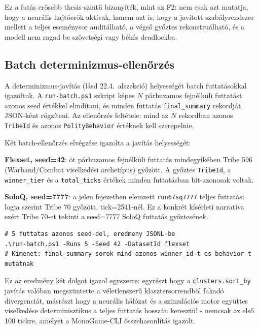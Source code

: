 ﻿\documentclass[a4paper,12pt]{report}
\begin{document}
Ez a futás erősebb thesis-szintű bizonyíték, mint az F2: nem csak azt mutatja, hogy
a neurális hajtóerők aktívak, hanem azt is, hogy a javított szabályrendszer mellett
a teljes eseménysor auditálható, a végső győztes rekonstruálható, és a modell nem
ragad be szövetségi vagy békés deadlockba.

\subsection*{Batch determinizmus-ellenőrzés}

A determinizmus-javítás (lásd 22.4.~alszekció) helyességét batch futtatásokkal igazoltuk. A \texttt{run-batch.ps1} szkript képes $N$ párhuzamos fejnélküli futtatást azonos seed értékkel elindítani, és minden futtatás \texttt{final\_summary} rekordját JSON-ként rögzíteni. Az ellenőrzés feltétele: mind az $N$ rekordban azonos \texttt{TribeId} és azonos \texttt{PolityBehavior} értéknek kell szerepelnie.

Két batch-ellenőrzés elvégzése igazolta a javítás helyességét:

\textbf{Flexset, seed=42}: öt párhuzamos fejnélküli futtatás mindegyikében Tribe 596 (Warband/Combat viselkedési archetípus) győzött. A győztes \texttt{TribeId}, a \texttt{winner\_tier} és a \texttt{total\_ticks} értékek minden futtatásban bit-azonosak voltak.

\textbf{SoloQ, seed=7777}: a jelen fejezetben elemzett \texttt{run67sq7777} teljes futtatási logja szerint Tribe 70 győzött, tick=2541-nél. Ez a konkrét kísérleti narratíva ezért Tribe 70-et tekinti a seed=7777 SoloQ futtatás győztesének.

\begin{lstlisting}[language={}, caption={Batch determinizmus-ellenőrzés parancssora}]
# 5 futtatas azonos seed-del, eredmeny JSONL-be
.\run-batch.ps1 -Runs 5 -Seed 42 -DatasetId flexset
# Kimenet: final_summary sorok mind azonos winner_id-t es behavior-t mutatnak
\end{lstlisting}

Ez az eredmény két dolgot igazol egyszerre: egyrészt hogy a \texttt{clusters.sort\_by} javítás valóban megszüntette a véletlenszerű klasztersorrendből fakadó divergenciát, másrészt hogy a neurális hálózat és a szimulációs motor együttes viselkedése determinisztikus a teljes futtatás hosszán keresztül - nemcsak az első 100 tickre, amelyet a MonoGame-CLI összehasonlítás igazolt.
\end{document}
